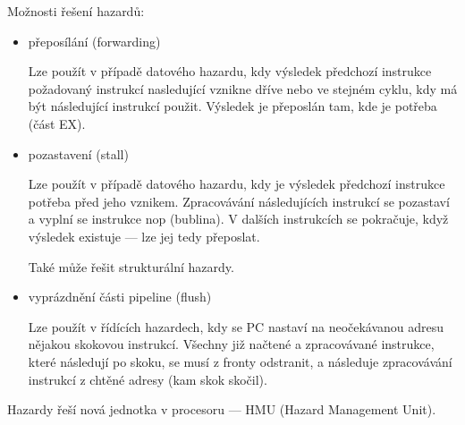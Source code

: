 Možnosti řešení hazardů:
\begin{itemize}
	\item přeposílání (forwarding)
	
	Lze použít v případě datového hazardu, kdy výsledek předchozí instrukce požadovaný instrukcí nasledující vznikne dříve nebo ve stejném cyklu, kdy má být následující instrukcí použit. Výsledek je přeposlán tam, kde je potřeba (část EX). 	
	
	\item pozastavení (stall)
	
	Lze použít v případě datového hazardu, kdy je výsledek předchozí instrukce potřeba před jeho vznikem. Zpracovávání následujících instrukcí se pozastaví a vyplní se instrukce nop (bublina). V dalších instrukcích se pokračuje, když výsledek existuje --- lze jej tedy přeposlat.	
	
	Také může řešit strukturální hazardy.
	
	\item vyprázdnění části pipeline (flush)
	
	Lze použít v řídících hazardech, kdy se PC nastaví na neočekávanou adresu nějakou skokovou instrukcí. Všechny již načtené a zpracovávané instrukce, které následují po skoku, se musí z fronty odstranit, a následuje zpracovávání instrukcí z chtěné adresy (kam skok skočil).
\end{itemize}

Hazardy řeší nová jednotka v procesoru --- HMU (Hazard Management Unit).
